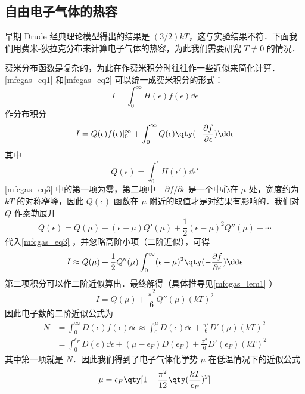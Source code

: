 \subsection{自由电子气体的热容}
早期 Drude 经典理论模型得出的结果是 $(3/2)k T$，这与实验结果不符．下面我们用费米-狄拉克分布来计算电子气体的热容，为此我们需要研究 $T\neq 0$ 的情况．

费米分布函数是复杂的，为此在作费米积分时往往作一些近似来简化计算．\autoref{mfcgas_eq1} 和\autoref{mfcgas_eq2} 可以统一成费米积分的形式：
\begin{equation}
I=\int_0^\infty H(\epsilon)f(\epsilon)\dd\epsilon
\end{equation}
作分布积分
\begin{equation}\label{mfcgas_eq3}
I=Q(\epsilon)f(\epsilon)|_0^\infty + \int_0^\infty Q(\epsilon)\qty(-\frac{\partial f}{\partial\epsilon})\dd \epsilon
\end{equation}
其中
\begin{equation}
Q(\epsilon)=\int_0^\epsilon H(\epsilon')\dd\epsilon'
\end{equation}
\autoref{mfcgas_eq3} 中的第一项为零，第二项中 $-\partial f/\partial \epsilon$ 是一个中心在 $\mu$ 处，宽度约为 $kT$ 的对称窄峰，因此 $Q(\epsilon)$ 函数在 $\mu$ 附近的取值才是对结果有影响的．我们对 $Q$ 作泰勒展开
\begin{equation}
Q(\epsilon)=Q(\mu)+(\epsilon-\mu)Q'(\mu)+\frac{1}{2}(\epsilon-\mu)^2 Q''(\mu)+\cdots
\end{equation}
代入\autoref{mfcgas_eq3} ，并忽略高阶小项（二阶近似），可得
\begin{equation}
I\approx Q(\mu)+\frac{1}{2}Q''(\mu)\int_0^\infty (\epsilon-\mu)^2 \qty(-\frac{\partial f}{\partial \epsilon})\dd\epsilon
\end{equation}
第二项积分可以作二阶近似算出．最终解得（具体推导见\autoref{mfcgas_lem1} ）
\begin{equation}
I=Q(\mu)+\frac{\pi^2}{6}Q''(\mu)(k T)^2
\end{equation}
因此电子数的二阶近似公式为
\begin{equation}
\begin{aligned}
N&=\int_0^\infty D(\epsilon) f(\epsilon) \dd\epsilon \approx 
\int_0^\mu D(\epsilon) \dd \epsilon + \frac{\pi^2}{6}D'(\mu)(kT)^2\\
&=\int_0^{\epsilon_F} D(\epsilon)\dd\epsilon+(\mu-\epsilon_F) D(\epsilon_F) + \frac{\pi^2}{6}D'(\epsilon_F)(kT)^2
\end{aligned}
\end{equation}
其中第一项就是 $N$．因此我们得到了电子气体化学势 $\mu$ 在低温情况下的近似公式
\begin{equation}
\mu=\epsilon_F\qty[1-\frac{\pi^2}{12}\qty(\frac{kT}{\epsilon_F})^2]
\end{equation}

